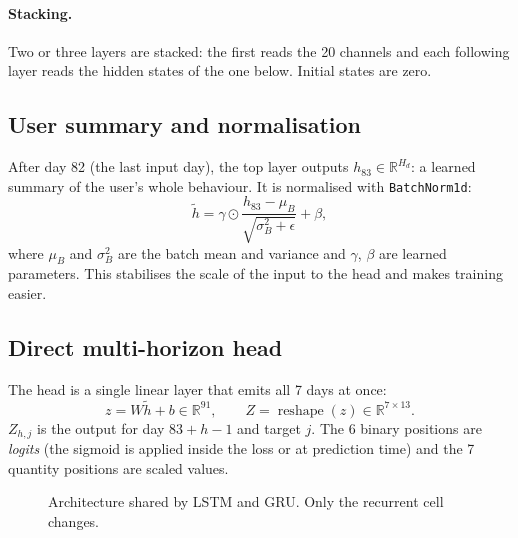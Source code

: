 \documentclass[11pt]{article}
\newcommand{\R}{\mathbb{R}}
\newcommand{\code}[1]{\texttt{#1}}
\begin{document}
\paragraph{Stacking.} Two or three layers are stacked: the first reads the 20 channels and each following layer reads the hidden states of the one below. Initial states are zero.

\subsection{User summary and normalisation}

After day 82 (the last input day), the top layer outputs $h_{83} \in \R^{H_d}$: a learned summary of the user's whole behaviour. It is normalised with \code{BatchNorm1d}:
\begin{equation}
\tilde h = \gamma \odot \frac{h_{83} - \mu_B}{\sqrt{\sigma^2_B + \epsilon}} + \beta,
\end{equation}
where $\mu_B$ and $\sigma^2_B$ are the batch mean and variance and $\gamma$, $\beta$ are learned parameters. This stabilises the scale of the input to the head and makes training easier.

\subsection{Direct multi-horizon head}

The head is a single linear layer that emits all 7 days at once:
\begin{equation}
z = W \tilde h + b \in \R^{91}, \qquad Z = \operatorname{reshape}(z) \in \R^{7 \times 13}.
\end{equation}
$Z_{h,j}$ is the output for day $83 + h - 1$ and target $j$. The 6 binary positions are \emph{logits} (the sigmoid is applied inside the loss or at prediction time) and the 7 quantity positions are scaled values.

\begin{figure}[H]
\centering
{}
\caption{Architecture shared by LSTM and GRU. Only the recurrent cell changes.}
\end{figure}
\end{document}
